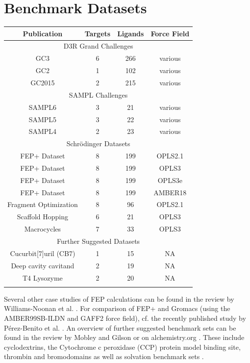 \documentclass[9pt,bestpractices]{livecoms}
\begin{document}
\section{Benchmark Datasets}
\label{sec:benchmark}
\vspace{5mm}
\begin{tabular}{cccc}
\caption{Overview of benchmark datasets}
\textbf{Publication} & \textbf{Targets} & \textbf{Ligands} & \textbf{Force Field} \\
\hline
\multicolumn{4}{|c|}{D3R Grand Challenges \cite{D3R}} \\
\hline
GC3 \cite{gaieb2019} & 6 & 266 & various \\
GC2 \cite{gaieb2018} & 1 & 102 & various \\
GC2015 \cite{gathiaka2016} & 2 & 215 & various \\
\hline
\multicolumn{4}{|c|}{SAMPL Challenges \cite{SAMPL}} \\
\hline
SAMPL6 \cite{rizzi2018} & 3 & 21 & various \\
SAMPL5 \cite{yin2017} & 3 & 22 & various \\
SAMPL4 \cite{muddana2014} & 2 & 23 & various \\
\hline
\multicolumn{4}{|c|}{Schrödinger Datasets} \\
\hline
FEP+ Dataset \cite{wang2015} & 8 & 199 & OPLS2.1 \\
FEP+ Dataset \cite{harder2016} & 8 & 199 & OPLS3 \\
FEP+ Dataset \cite{roos2019} & 8 & 199 & OPLS3e \\
FEP+ Dataset \cite{song2019} & 8 & 199 & AMBER18 \\
Fragment Optimization \cite{steinbrecher2015} & 8 & 96 & OPLS2.1 \\
Scaffold Hopping \cite{wang2017} & 6 & 21 & OPLS3 \\
Macrocycles \cite{yu2017} & 7 & 33 & OPLS3 \\
\hline
\multicolumn{4}{|c|}{Further Suggested Datasets} \\
\hline
Cucurbit[7]uril (CB7) \cite{mobley2017} & 1 & 15 & NA \\
Deep cavity cavitand \cite{mobley2017} & 2 & 19 & NA \\
T4 Lysozyme \cite{mobley2017} & 2 & 20 & NA \\
\hline
\label{tab:benchmarks}
\end{tabular}

Several other case studies of FEP calculations can be found in the review by Williams-Noonan et al. \cite{williams2017}. For comparison of FEP+ and Gromacs (using the AMBER99SB-ILDN and GAFF2 force field), cf. the recently published study by Pérez-Benito et al. \cite{perez2019}.
An overview of further suggested benchmark sets can be found in the review by Mobley and Gilson \cite{mobley2017} or on alchemistry.org \cite{alchemistry}. These include cyclodextrins, the Cytochrome c peroxidase (CCP) protein model binding site, thrombin and bromodomains as well as solvation benchmark sets \cite{paliwal2011}. 
\end{document}
